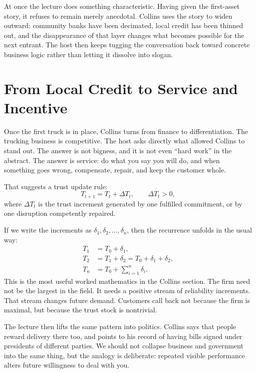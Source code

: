 At once the lecture does something characteristic. Having given the first-asset story, it refuses to remain merely anecdotal. Collins uses the story to widen outward: community banks have been decimated, local credit has been thinned out, and the disappearance of that layer changes what becomes possible for the next entrant. The host then keeps tugging the conversation back toward concrete business logic rather than letting it dissolve into slogan.

\section{From Local Credit to Service and Incentive}

Once the first truck is in place, Collins turns from finance to differentiation. The trucking business is competitive. The host asks directly what allowed Collins to stand out. The answer is not bigness, and it is not even ``hard work'' in the abstract. The answer is service: do what you say you will do, and when something goes wrong, compensate, repair, and keep the customer whole.

That suggests a trust update rule:
\begin{equation}
T_{t+1}=T_t+\Delta T_t,\qquad \Delta T_t>0,
\end{equation}
where $\Delta T_t$ is the trust increment generated by one fulfilled commitment, or by one disruption competently repaired.

If we write the increments as $\delta_1,\delta_2,\dots,\delta_n$, then the recurrence unfolds in the usual way:
\begin{align}
T_1 &= T_0+\delta_1,\\
T_2 &= T_1+\delta_2 = T_0+\delta_1+\delta_2,\\
T_n &= T_0+\sum_{i=1}^n \delta_i.
\end{align}
This is the most useful worked mathematics in the Collins section. The firm need not be the largest in the field. It needs a positive stream of reliability increments. That stream changes future demand. Customers call back not because the firm is maximal, but because the trust stock is nontrivial.

The lecture then lifts the same pattern into politics. Collins says that people reward delivery there too, and points to his record of having bills signed under presidents of different parties. We should not collapse business and government into the same thing, but the analogy is deliberate: repeated visible performance alters future willingness to deal with you.


